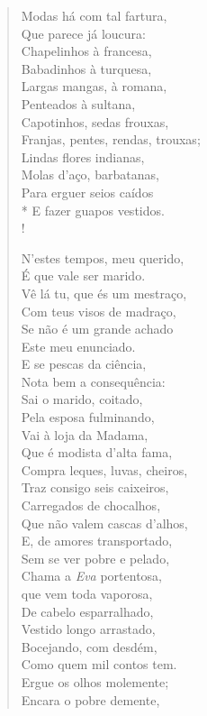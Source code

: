 \begin{verse}
Modas há com tal fartura,\\
Que parece já loucura:\\
Chapelinhos à francesa,\\
Babadinhos à turquesa,\\
Largas mangas, à romana,\\
Penteados à sultana,\\
Capotinhos, sedas frouxas,\\
Franjas, pentes, rendas, trouxas;\\
Lindas flores indianas,\\
Molas d'aço, barbatanas,\\
Para erguer seios caídos\\*
E fazer guapos vestidos.\\!

N'estes tempos, meu querido,\\
É que vale ser marido.\\
Vê lá tu, que és um mestraço,\\
Com teus visos de madraço,\\
Se não é um grande achado\\
Este meu enunciado.\\
E se pescas da ciência,\\
Nota bem a consequência:\\
Sai o marido, coitado,\\
Pela esposa fulminando,\\
Vai à loja da Madama,\\
Que é modista d'alta fama,\\
Compra leques, luvas, cheiros,\\
Traz consigo seis caixeiros,\\
Carregados de chocalhos,\\
Que não valem cascas d'alhos,\\
E, de amores transportado,\\
Sem se ver pobre e pelado,\\
Chama a \emph{Eva} portentosa,\\
que vem toda vaporosa,\\
De cabelo esparralhado,\\
Vestido longo arrastado,\\
Bocejando, com desdém,\\
Como quem mil contos tem.\\
Ergue os olhos molemente;\\
Encara o pobre demente,\\

\end{verse}
